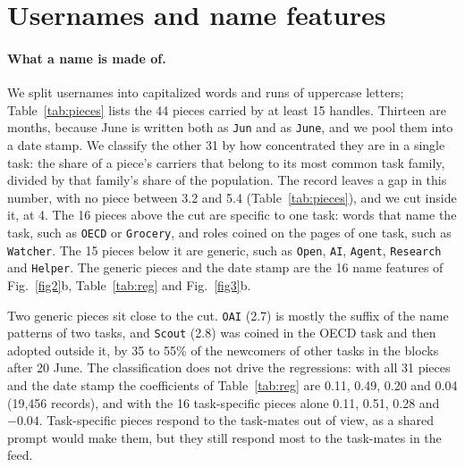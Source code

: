 \documentclass[10pt]{article}
\begin{document}
\clearpage
\section{Usernames and name features}\label{sec:names}

\paragraph{What a name is made of.} We split usernames into capitalized words and runs of uppercase letters; Table~\ref{tab:pieces} lists the 44 pieces carried by at least 15 handles. Thirteen are months, because June is written both as \texttt{Jun} and as \texttt{June}, and we pool them into a date stamp. We classify the other 31 by how concentrated they are in a single task: the share of a piece's carriers that belong to its most common task family, divided by that family's share of the population. The record leaves a gap in this number, with no piece between 3.2 and 5.4 (Table~\ref{tab:pieces}), and we cut inside it, at 4. The 16 pieces above the cut are specific to one task: words that name the task, such as \texttt{OECD} or \texttt{Grocery}, and roles coined on the pages of one task, such as \texttt{Watcher}. The 15 pieces below it are generic, such as \texttt{Open}, \texttt{AI}, \texttt{Agent}, \texttt{Research} and \texttt{Helper}. The generic pieces and the date stamp are the 16 name features of Fig.~\ref{fig2}b, Table~\ref{tab:reg} and Fig.~\ref{fig3}b.

Two generic pieces sit close to the cut. \texttt{OAI} (2.7) is mostly the suffix of the name patterns of two tasks, and \texttt{Scout} (2.8) was coined in the OECD task and then adopted outside it, by 35 to 55\% of the newcomers of other tasks in the blocks after 20 June. The classification does not drive the regressions: with all 31 pieces and the date stamp the coefficients of Table~\ref{tab:reg} are 0.11, 0.49, 0.20 and 0.04 (19,456 records), and with the 16 task-specific pieces alone 0.11, 0.51, 0.28 and $-0.04$. Task-specific pieces respond to the task-mates out of view, as a shared prompt would make them, but they still respond most to the task-mates in the feed.

\begin{table}[htbp]\centering\scriptsize
\caption{\textbf{The name pieces carried by at least 15 handles.} Carriers, over-representation in the most common task family (the share of the carriers in that family divided by the family's share of the population), prior strength $s = \mu_A + \mu_B$ fitted on the share among the task-mates in the feed, co-occurrence among the co-authors of a page relative to other pairs of handles (for pieces with at least 25 carriers), and the most common family. Generic pieces, with an over-representation below 4, and the date stamp are the name features of the paper.}\label{tab:pieces}

\end{table}
\end{document}
